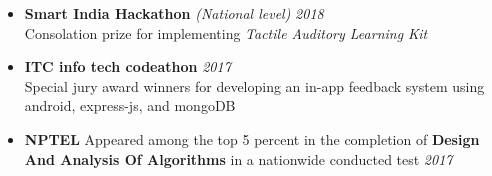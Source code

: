 \documentclass[11pt,a4paper]{article}
\begin{document}
\colorbox{gray}{}
\begin{itemize}
    \item \textbf{Smart India Hackathon} \textit{(National level)} \hfill \textit{2018}
    \\Consolation prize for implementing \emph{Tactile Auditory Learning Kit} 
    \item \textbf{ITC info tech codeathon} \hfill \textit{2017}
    \\ Special jury award winners for developing an in-app feedback system using android, express-js, and mongoDB
    \item \textbf{NPTEL} Appeared among the top 5 percent in the completion of \textbf{Design And Analysis Of Algorithms} in a nationwide conducted test \hfill \textit{2017}
\end{itemize}
  
\end{document}
